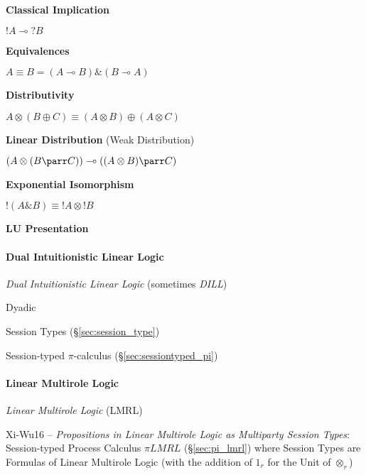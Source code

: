 \textbf{Classical Implication}

$!A \multimap ?B$


\textbf{Equivalences}

$A \equiv B = (A \multimap B) \& (B \multimap A)$


\textbf{Distributivity}

$A \otimes (B \oplus C) \equiv (A \otimes B) \oplus (A \otimes C)$


\textbf{Linear Distribution} (Weak Distribution)

$(A \otimes (B \parr C)) \multimap ((A \otimes B) \parr C)$


\textbf{Exponential Isomorphism}

$!(A \& B) \equiv !A \otimes !B$


\textbf{LU Presentation}



\paragraph{Dual Intuitionistic Linear Logic}\hfill
\label{sec:dual_linear_logic}

\cite{andreoli92}

\emph{Dual Intuitionistic Linear Logic} (sometimes \emph{DILL})

Dyadic

Session Types (\S\ref{sec:session_type})

Session-typed $\pi$-calculus (\S\ref{sec:sessiontyped_pi})



\paragraph{Linear Multirole Logic}\label{sec:lmrl}\hfill

\begingroup

\newcommand{\msg}{\mathtt{msg}}
\newcommand{\nil}{\mathtt{nil}}

\newcommand{\channelsend}{\mathtt{channel\_send}}
\newcommand{\channelrecv}{\mathtt{channel\_recv}}
\newcommand{\channelclose}{\mathtt{channel\_close}}
\newcommand{\channelskip}{\mathtt{channel\_skip}}

\newcommand{\Chan}{\mathsf{Chan}}
\newcommand{\Int}{\mathsf{Int}}
\renewcommand{\Unit}{\mathsf{()}}

\emph{Linear Multirole Logic} (LMRL)

Xi-Wu16 -- \emph{Propositions in Linear Multirole Logic as Multiparty
  Session Types}: Session-typed Process Calculus $\pi LMRL$
(\S\ref{sec:pi_lmrl}) where Session Types are Formulas of Linear
Multirole Logic (with the addition of $1_r$ for the Unit of
$\otimes_r$)

